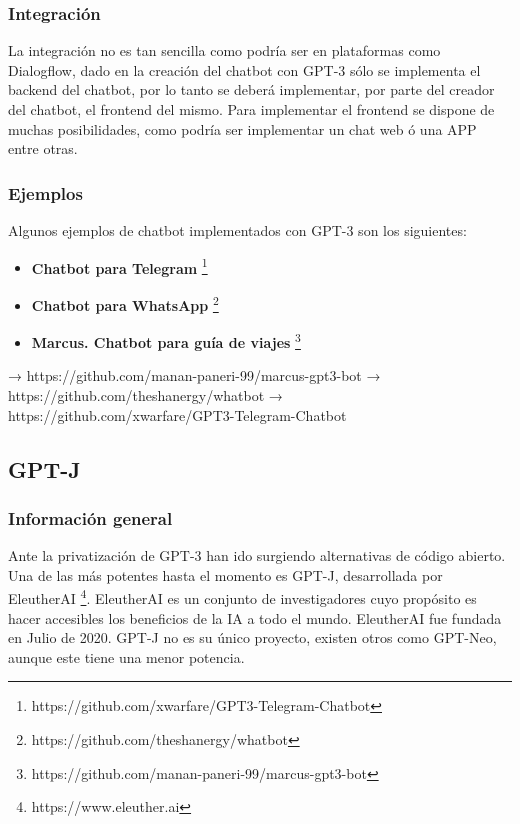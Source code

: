 \subsubsection*{Integración}

La integración no es tan sencilla como podría ser en plataformas como Dialogflow, dado en la creación del chatbot con GPT-3 sólo se implementa el backend del chatbot, por lo tanto se deberá implementar, por parte del creador del chatbot, el frontend del mismo. Para implementar el frontend se dispone de muchas posibilidades, como podría ser implementar un chat web ó una APP entre otras.

\subsubsection*{Ejemplos}

Algunos ejemplos de chatbot implementados con GPT-3 son los siguientes:

\begin{itemize}
    \item \textbf{Chatbot para Telegram} \footnote{https://github.com/xwarfare/GPT3-Telegram-Chatbot}
    \item \textbf{Chatbot para WhatsApp} \footnote{https://github.com/theshanergy/whatbot}
    \item \textbf{Marcus. Chatbot para guía de viajes} \footnote{https://github.com/manan-paneri-99/marcus-gpt3-bot}
\end{itemize}



→ https://github.com/manan-paneri-99/marcus-gpt3-bot
→ https://github.com/theshanergy/whatbot
→ https://github.com/xwarfare/GPT3-Telegram-Chatbot


\subsection{GPT-J}

\subsubsection*{Información general}

Ante la privatización de GPT-3 han ido surgiendo alternativas de código abierto. Una de las más potentes hasta el momento es GPT-J, desarrollada por EleutherAI \footnote{https://www.eleuther.ai}. EleutherAI es un conjunto de investigadores cuyo propósito es hacer accesibles los beneficios de la IA a todo el mundo. EleutherAI fue fundada en Julio de 2020. GPT-J no es su único proyecto, existen otros como GPT-Neo, aunque este tiene una menor potencia.

